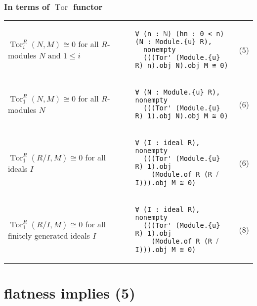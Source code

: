 \documentclass[aspectratio=169]{beamer}
\begin{document}
\begin{frame}[fragile]
\frametitle{In terms of $\operatorname{Tor}$ functor}

\renewcommand{\arraystretch}{3.5} %
\begin{tabular}{llr}%

\parbox[h]{.27\textwidth}{$\operatorname{Tor}_i^R(N, M)\cong 0$ for all $R$-modules $N$ and $1 \le i$} &
\begin{lstlisting}
∀ (n : ℕ) (hn : 0 < n) (N : Module.{u} R), 
  nonempty 
  (((Tor' (Module.{u} R) n).obj N).obj M ≅ 0)
\end{lstlisting} & (5)   %
\\

\parbox[h]{.27\textwidth}{$\operatorname{Tor}_1^R(N, M)\cong 0$ for all $R$-modules $N$} & 
\begin{lstlisting}
∀ (N : Module.{u} R), nonempty 
  (((Tor' (Module.{u} R) 1).obj N).obj M ≅ 0)
\end{lstlisting} & (6) 
\\

\parbox[h]{.27\textwidth}{$\operatorname{Tor}_1^R(R/I, M)\cong 0$ for all ideals $I$} &
\begin{lstlisting}
∀ (I : ideal R), nonempty 
  (((Tor' (Module.{u} R) 1).obj 
    (Module.of R (R ⧸ I))).obj M ≅ 0)
\end{lstlisting} & (6)  
\\

\parbox[h]{.27\textwidth}{$\operatorname{Tor}_1^R(R/I, M)\cong 0$ for all finitely generated ideals $I$} &
\begin{lstlisting}
∀ (I : ideal R), nonempty 
  (((Tor' (Module.{u} R) 1).obj 
    (Module.of R (R ⧸ I))).obj M ≅ 0)
\end{lstlisting} & (8)  
\\
\end{tabular}

\end{frame}


\section*{flatness implies (5)}
\end{document}
